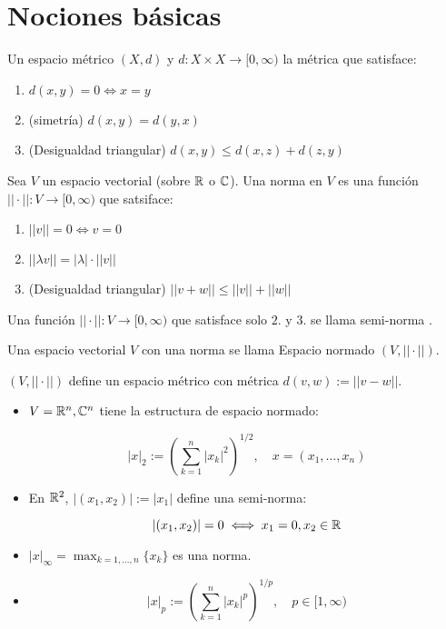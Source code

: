 \documentclass[../Apunte.tex]{subfiles}
\begin{document}
\section{Nociones básicas}

\begin{fdefinition}
    Un espacio métrico $(X,d)$ y $d:X\times X\to [0,\infty)$ la métrica que satisface:

    \begin{enumerate}
        \item $d(x,y)=0\iff x=y$
        \item (simetría) $d(x,y)=d(y,x)$
        \item (Desigualdad triangular) $d(x,y)\leq d(x,z)+d(z,y)$
    \end{enumerate}
\end{fdefinition}

\begin{fdefinition}[]
    Sea $V$ un espacio vectorial (sobre $\mathbb{R}$ o $\mathbb{C}$). Una norma en $V$ es una función $||\cdot||:V\to [0,\infty)$ que satsiface:

    \begin{enumerate}
        \item $||v||=0\iff v=0$
        \item $||\lambda v||=|\lambda|\cdot ||v||$
        \item (Desigualdad triangular) $||v+w||\leq ||v||+||w||$
    \end{enumerate}
\end{fdefinition}

Una función $||\cdot||:V\to[0,\infty)$ que satisface solo $2.$ y $3.$ se llama \color{red} semi-norma \color{black}.

Una espacio vectorial $V$ con una norma se llama \color{red} Espacio normado \color{black} $(V,||\cdot||)$.

\begin{fproposition}
    $(V,||\cdot||)$ define un espacio métrico con métrica $d(v,w):=||v-w||$.
\end{fproposition}

\begin{fexample}
    \begin{itemize}
        \item $V=\mathbb{R}^n,\mathbb{C}^n$ tiene la estructura de espacio normado:

    \[|x|_2:=\left(\sum_{k=1}^n |x_k|^2\right)^{1/2},\quad x=(x_1,\ldots,x_n)\]

    \item En $\mathbb{R}^2$, $|(x_1,x_2)|:=|x_1|$ define una semi-norma:


    \[|(x_1,x_2)|=0\iff x_1=0,x_2\in\mathbb{R}\]

    \item $|x|_\infty=\displaystyle\max_{k=1,\ldots,n}\{x_k\}$ es una norma.

    \item \[|x|_p:=\left(\sum_{k=1}^n |x_k|^p\right)^{1/p},\quad p\in [1,\infty)\]
    \end{itemize}



\end{fexample}
\end{document}
